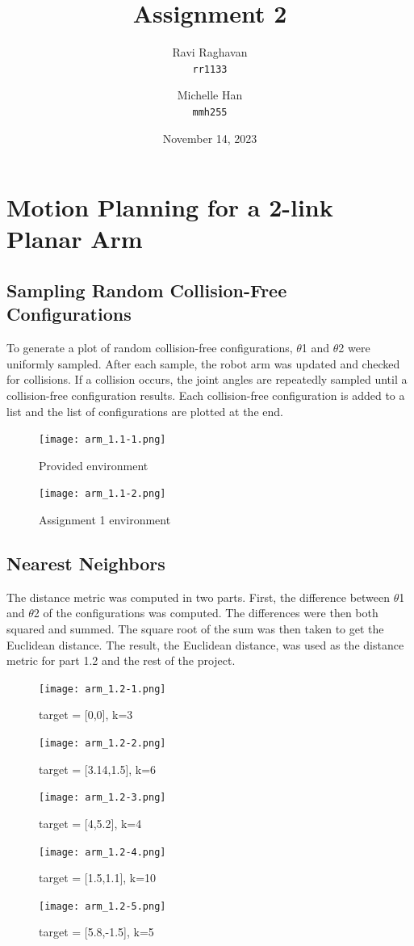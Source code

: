 \documentclass{article}
\title{Assignment 2}
\date{November 14, 2023}
\author{
  Ravi Raghavan\\
  \texttt{rr1133}
  \and
  Michelle Han\\
  \texttt{mmh255}
}
\begin{document}
\maketitle
\section{Motion Planning for a 2-link Planar Arm}
\subsection{Sampling Random Collision-Free Configurations}
To generate a plot of random collision-free configurations, $\theta$1 and $\theta$2 were uniformly sampled. After each sample, the robot arm was updated and checked for collisions. If a collision occurs, the joint angles are repeatedly sampled until a collision-free configuration results. Each collision-free configuration is added to a list and the list of configurations are plotted at the end.
\begin{figure}[h!]
     \begin{minipage}{0.48\textwidth}
    \texttt{[image: arm\_1.1-1.png]}
    \caption{Provided environment}
  \end{minipage}\hfill
  \begin{minipage}{0.48\textwidth}
    \texttt{[image: arm\_1.1-2.png]}
    \caption{Assignment 1 environment}
  \end{minipage}\hfill
\end{figure}
\subsection{Nearest Neighbors}
The distance metric was computed in two parts. First, the difference between $\theta$1 and $\theta$2 of the configurations was computed. The differences were then both squared and summed. The square root of the sum was then taken to get the Euclidean distance. The result, the Euclidean distance, was used as the distance metric for part 1.2 and the rest of the project.
\begin{figure}[htbp]
  \centering
  \begin{minipage}{0.45\textwidth}
    \texttt{[image: arm\_1.2-1.png]}
    \caption{target = [0,0], k=3}
  \end{minipage}\hfill
  \begin{minipage}{0.45\textwidth}
    \texttt{[image: arm\_1.2-2.png]}
    \caption{target = [3.14,1.5], k=6}
  \end{minipage}
  \begin{minipage}{0.45\textwidth}
    \texttt{[image: arm\_1.2-3.png]}
    \caption{target = [4,5.2], k=4}
  \end{minipage}\hfill
  \begin{minipage}{0.45\textwidth}
    \texttt{[image: arm\_1.2-4.png]}
    \caption{target = [1.5,1.1], k=10}
  \end{minipage}
   \begin{minipage}{0.45\textwidth}
    \texttt{[image: arm\_1.2-5.png]}
    \caption{target = [5.8,-1.5], k=5}
  \end{minipage}
\end{figure}
\end{document}
